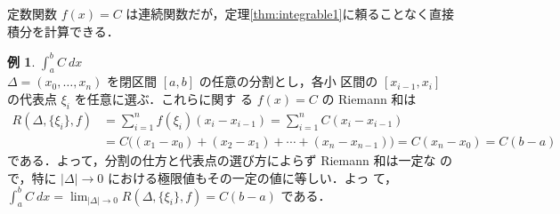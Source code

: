 \documentclass[10pt, uplatex, dvipdfmx]{jsarticle}
\theoremstyle{definition}
\newtheorem{example}[theorem]{例}
\numberwithin{equation}{section}
\newcommand{\ds}{\displaystyle}
\begin{document}
定数関数 $f(x) = C$ は連続関数だが，定理\ref{thm:integrable1}に頼ることなく直接積分を計算できる．
\begin{example}
  $\ds \int_{a}^{b} C \ dx$\\

  $\Delta = (x_0, \ldots, x_n)$ を閉区間 $[a,b]$ の任意の分割とし，各小
  区間の $[x_{i-1}, x_{i}]$ の代表点 $\xi_i$ を任意に選ぶ．これらに関す
  る $f(x) = C$ の Riemann 和は
  \[
    \begin{aligned}
      R(\Delta, \{\xi_i\}, f) &= \sum_{i=1}^{n} f(\xi_i) (x_i - x_{i-1}) = \sum_{i=1}^{n} C (x_{i}-x_{i-1})\\
                              & = C \Big( (x_1-x_0) + (x_2-x_1) + \cdots + (x_n-x_{n-1}) \Big)
                                = C(x_n-x_0) = C(b-a)
    \end{aligned}
  \]
  である．よって，分割の仕方と代表点の選び方によらず Riemann 和は一定な
  ので，特に $|\Delta|\to 0$ における極限値もその一定の値に等しい．よっ
  て，$\ds \int_{a}^{b} C \ dx = \lim_{|\Delta| \to 0} R(\Delta, \{\xi_i\}, f) = C(b-a)$ である．
\end{example}

\newpage
\end{document}

